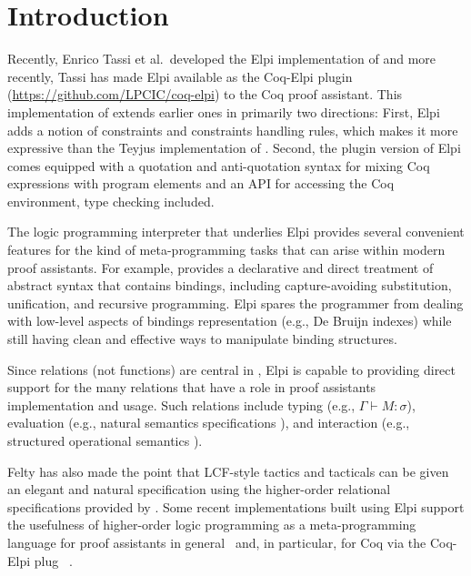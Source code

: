 \section{Introduction}
\label{sec:intro}

Recently, Enrico Tassi et al.\ developed the Elpi
implementation \cite{dunchev15lpar} of \lP \cite{miller12proghol} and
more recently, Tassi has made Elpi available as the Coq-Elpi
plugin~\cite{tassi18coqpl} (\url{https://github.com/LPCIC/coq-elpi})
to the Coq proof assistant.  This implementation of \lP extends
earlier ones in primarily two directions: First, Elpi adds a notion of
constraints and constraints handling rules, which makes it more
expressive than the Teyjus implementation \cite{nadathur99cade} of
\lP. Second, the plugin version of Elpi comes equipped with a
quotation and anti-quotation syntax for mixing Coq expressions with
\lP program elements and an API for accessing the Coq environment,
type checking included.

The logic programming interpreter that underlies Elpi provides several
convenient features for the kind of meta-programming tasks that can
arise within modern proof assistants.  For example, \lP provides a
declarative and direct treatment of abstract syntax that contains
bindings, including capture-avoiding substitution,
unification, and recursive programming.  Elpi spares the
programmer from dealing with low-level aspects of bindings
representation (e.g., De Bruijn indexes) while still having clean and
effective ways to manipulate binding structures.

Since relations (not functions) are central in \lP, Elpi is capable to
providing direct support for the many relations that have a role in
proof assistants implementation and usage.  Such relations include
typing (e.g., $\Gamma\vdash M\colon\sigma$), evaluation (e.g., natural
semantics specifications \cite{kahn87stacs,hannan93jfp}), and
interaction (e.g., structured operational semantics
\cite{milner89book,plotkin81}).

Felty has also made the point that LCF-style tactics and tacticals can
be given an elegant and natural specification using the higher-order
relational specifications provided by \lP \cite{felty93jar}.  Some
recent implementations built using Elpi support the usefulness of
higher-order logic programming as a meta-programming language for
proof assistants in general~\cite{DunchevCT16,coen19mscs} and, in
particular, for Coq via the Coq-Elpi plug~\cite{CohenST20,tassi19itp} .

